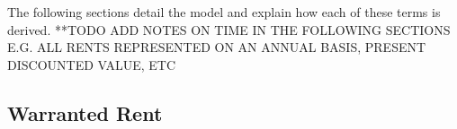 

The following sections detail the model and explain how each of these terms is derived.
**TODO ADD NOTES ON TIME IN THE FOLLOWING SECTIONS E.G. ALL RENTS REPRESENTED ON AN ANNUAL BASIS, PRESENT DISCOUNTED VALUE, ETC

\subsection{Warranted Rent} \label{section-warranted-rent}

